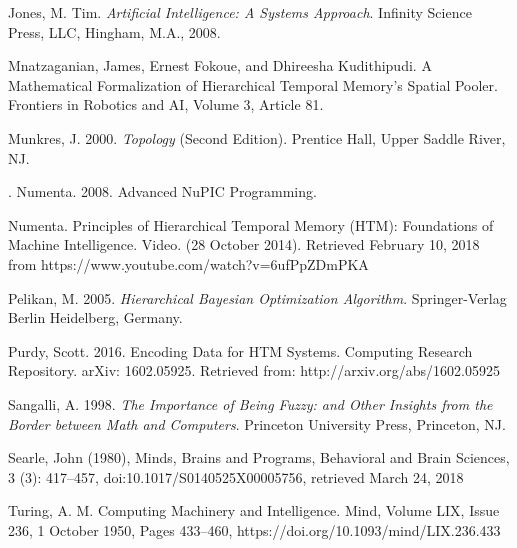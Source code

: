 \documentclass[fleqn,notitlepage,minimal]{article}
\begin{document}
\begin{thebibliography}{99}
		 Jones, M. Tim. \emph{Artificial Intelligence: A Systems Approach}. Infinity Science Press, LLC, Hingham, M.A., 2008.
		
		 Mnatzaganian, James, Ernest Fokoue, and Dhireesha Kudithipudi. A Mathematical Formalization of Hierarchical Temporal Memory's Spatial Pooler. Frontiers in Robotics and AI, Volume 3, Article 81.
		
		 Munkres, J. 2000. \textit{Topology} (Second Edition). Prentice Hall, Upper Saddle River, NJ.
		
		. Numenta. 2008. Advanced NuPIC Programming. 
		
		 Numenta. Principles of Hierarchical Temporal Memory (HTM): Foundations of Machine Intelligence. Video. (28 October 2014). Retrieved February 10, 2018 from https://www.youtube.com/watch?v=6ufPpZDmPKA
		
		 Pelikan, M. 2005. \textit{Hierarchical Bayesian Optimization Algorithm}. Springer-Verlag Berlin Heidelberg, Germany.
		
		 Purdy, Scott. 2016. Encoding Data for HTM Systems. Computing Research Repository. arXiv: 1602.05925. Retrieved from: http://arxiv.org/abs/1602.05925
		
		 Sangalli, A. 1998. \textit{The Importance of Being Fuzzy: and Other Insights from the Border between Math and Computers}. Princeton University Press, Princeton, NJ.
		
		 Searle, John (1980), Minds, Brains and Programs, Behavioral and Brain Sciences, 3 (3): 417–457, doi:10.1017/S0140525X00005756, retrieved March 24, 2018
		
		 Turing, A. M. Computing Machinery and Intelligence. Mind, Volume LIX, Issue 236, 1 October 1950, Pages 433–460, https://doi.org/10.1093/mind/LIX.236.433
		
		
	\end{thebibliography}
	
\end{document}
